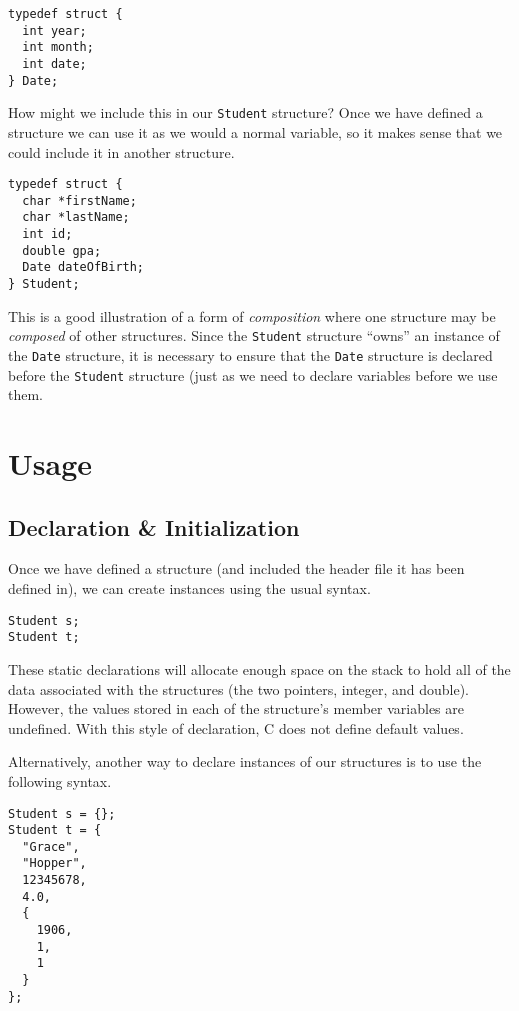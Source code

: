 \begin{verbatim}
typedef struct {
  int year;
  int month;
  int date;
} Date;
\end{verbatim}

How might we include this in our \texttt{Student} structure?
Once we have defined a structure we can use it as we would a normal
variable, so it makes sense that we could include it in another structure.

\begin{verbatim}
typedef struct {
  char *firstName;
  char *lastName;
  int id;
  double gpa;
  Date dateOfBirth;
} Student;
\end{verbatim}

This is a good illustration of a form of \emph{composition} where 
one structure may be \emph{composed} of other structures.  Since
the \texttt{Student} structure ``owns'' an instance of the
\texttt{Date} structure, it is necessary to ensure that 
the \texttt{Date} structure is declared before the 
\texttt{Student} structure (just as we need to declare 
variables before we use them.

\section{Usage}

\subsection{Declaration \& Initialization}

Once we have defined a structure (and included the header file
it has been defined in), we can create instances using the usual
syntax.

\begin{verbatim}
Student s;
Student t;
\end{verbatim}

These static declarations will allocate enough space on the stack
to hold all of the data associated with the structures (the two
pointers, integer, and double).  However, the values stored in 
each of the structure's member variables are undefined.  With
this style of declaration, C does not define default values.

Alternatively, another way to declare instances of our structures
is to use the following syntax.

\begin{verbatim}
Student s = {};
Student t = {
  "Grace",
  "Hopper",
  12345678,
  4.0,
  {
    1906,
    1,
    1
  }
};
\end{verbatim}


